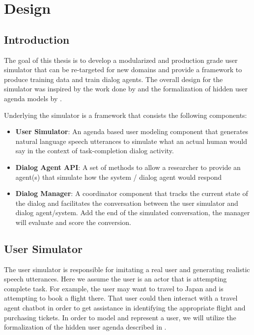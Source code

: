 \chapter{Design}
\label{chap:design}

\section{Introduction}
\label{sec:designintroduction}

The goal of this thesis is to develop a modularized and production grade user simulator that can be re-targeted for new domains and provide a framework to produce training data and train dialog agents. The overall design for the simulator was inspired by the work done by \cite{li_usersim} and the formalization of hidden user agenda models by \cite{Schatzmann2009TheHA}. 

Underlying the simulator is a framework that consists the following components:
\begin{itemize}
	\item \textbf{User Simulator}: An agenda based user modeling component that generates natural language speech utterances to simulate what an actual human would say in the context of task-completion dialog activity. 
	\item \textbf{Dialog Agent API}: A set of methods to allow a researcher to provide an agent(s) that simulate how the system / dialog agent would respond 
	\item \textbf{Dialog Manager}: A coordinator component that tracks the current state of the dialog and facilitates the conversation between the user simulator and dialog agent/system. Add the end of the simulated conversation, the manager will evaluate and score the conversion. 
\end{itemize}

\section{User Simulator} 

The user simulator is responsible for imitating a real user and generating realistic speech utterances. Here we assume the user is an actor that is attempting complete task. For example, the user may want to travel to Japan and is attempting to book a flight there. That user could then interact with a travel agent chatbot in order to get assistance in identifying the appropriate flight and purchasing tickets. In order to model and represent a user, we will utilize the formalization of the hidden user agenda described in \cite{Schatzmann2009TheHA}.

